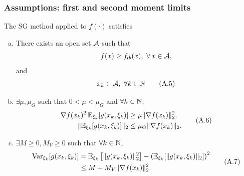 \documentclass[usepdftitle=false, aspectratio=169]{beamer}
\begin{document}
\begin{frame}
\frametitle{Assumptions: first and second moment limits}

The SG method applied to $f(\cdot)$ satisfies
\begin{enumerate}[a)]
\item
There exists an open set ${\mathcal{A}}$ such that
$$
f(x) \geq f_{lb}(x),\ \forall\, x \in {\mathcal{A}},
$$
and
\begin{equation}
x_k \in \calA,\ \forall k \in \NN
\tag{A.5}
\label{ass:open_set}
\end{equation}
\item
$\exists \mu, \mu_G$ such that $0 < \mu < \mu_G$ and $\forall k \in {\mathbb{N}}$,
\begin{equation}
\begin{aligned}
\nabla f(x_k)^T {\mathbb{E}}_{\xi_k} [g(x_k, \xi_k)] &\geq \mu \| \nabla f(x_k) \|_2^2, \\
\| {\mathbb{E}}_{\xi_k} [g(x_k, \xi_k)] \|_2 &\leq \mu_G \| \nabla f(x_k) \|_2.
\end{aligned}
\tag{A.6}
\label{ass:sufficient_descent}
\end{equation}
\item
$\exists M \geq 0, M_V \geq 0$ such that $\forall k \in {\mathbb{N}}$,
\begin{equation}
	\begin{aligned}
\operatorname{Var}_{\xi_k} [g(x_k, \xi_k)]
&= {\mathbb{E}}_{\xi_k} \left[ \| g(x_k, \xi_k) \|^2_2 \right] - \left( {\mathbb{E}}_{\xi_k} [\| g(x_k, \xi_k) \|_2] \right)^2 \\
&\leq M + M_V \| \nabla f(x_k) \|_2^2.
\end{aligned}
\tag{A.7}
\label{ass:varg}
\end{equation}
\end{enumerate}
	
\end{frame}
\end{document}
